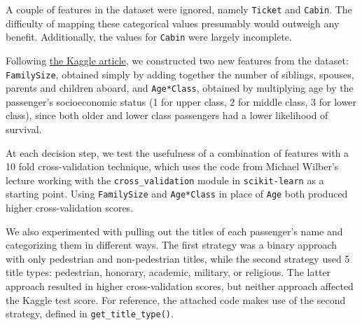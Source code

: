 \documentclass[12pt]{report}
\begin{document}
A couple of features in the dataset were ignored, namely \verb+Ticket+ and \verb+Cabin+. The difficulty of mapping these categorical values presumably would outweigh any
benefit. Additionally, the values for \verb+Cabin+ were largely incomplete.

Following \href{https://www.kaggle.com/c/titanic/details/getting-started-with-python-ii}{the Kaggle article}, we constructed two new features from the dataset:
\verb+FamilySize+, obtained simply by adding together the number of siblings, spouses, parents and children aboard, and \verb+Age*Class+, obtained by multiplying age by the passenger's
socioeconomic status (1 for upper class, 2 for middle class, 3 for lower class), since both older and lower class passengers had a lower likelihood of survival.

At each decision step, we test the usefulness of a combination of features with a 10 fold cross-validation technique, which uses the code from Michael Wilber's lecture working with the \verb+cross_validation+
module in \verb+scikit-learn+ as a starting point.
Using \verb+FamilySize+ and \verb+Age*Class+ in place of \verb+Age+ both produced higher cross-validation scores.

We also experimented with pulling out the titles of each passenger's name and categorizing them in different ways. The first strategy was a binary approach with only pedestrian and non-pedestrian titles,
while the second strategy used 5 title types: pedestrian, honorary, academic, military, or religious. The latter approach resulted in higher cross-validation scores, but neither approach affected the Kaggle test score.
For reference, the attached code makes use of the second strategy, defined in \verb+get_title_type()+.
\end{document}
